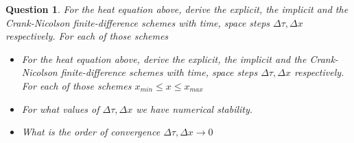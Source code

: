 \documentclass[16pt]{article}
\newtheorem{qu}{Question}[section]
\begin{document}
	
		\begin{qu}
			For the heat equation above, derive the explicit, the implicit and the Crank-Nicolson finite-difference schemes with time, space steps $\Delta \tau, \Delta x$ respectively.
			For each of those schemes
			\begin{itemize}
				\item For the heat equation above, derive the explicit, the implicit and the Crank-Nicolson finite-difference schemes with time, space steps  $\Delta \tau, \Delta x$ respectively.
				For each of those schemes $ x_{min}  \le x \le x_{max}$ \\
				\item
				For what values of $\Delta \tau, \Delta x$  we have numerical stability. \\
				\item
				What is the order of convergence  $\Delta \tau, \Delta x \rightarrow 0$
			\end{itemize}
		\end{qu}
		
\end{document}
